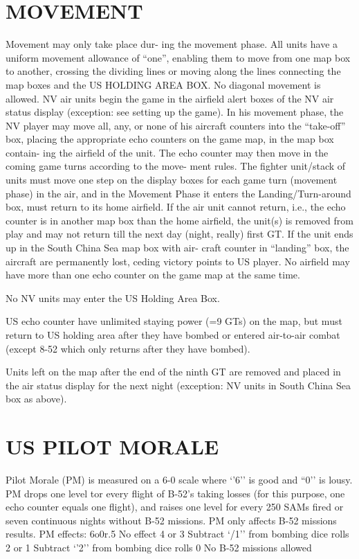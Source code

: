 \section*{MOVEMENT}
Movement may only take place dur-
ing the movement phase. All units
have a uniform movement allowance
of “one”, enabling them to move
from one map box to another, crossing
the dividing lines or moving along the
lines connecting the map boxes and
the US HOLDING AREA BOX. No
diagonal movement is allowed.
NV air units begin the game in the
airfield alert boxes of the NV air
status display (exception: see setting
up the game). In his movement
phase, the NV player may move all,
any, or none of his aircraft counters
into the “take-off” box, placing the
appropriate echo counters on the
game map, in the map box contain-
ing the airfield of the unit. The echo
counter may then move in the coming
game turns according to the move-
ment rules. The fighter unit/stack of
units must move one step on the
display boxes for each game turn
(movement phase) in the air, and in
the Movement Phase it enters the
Landing/Turn-around box, must
return to its home airfield. If the air
unit cannot return, i.e., the echo
counter is in another map box than
the home airfield, the unit(s) is
removed from play and may not
return till the next day (night, really)
first GT. If the unit ends up in the
South China Sea map box with air-
craft counter in “landing” box, the
aircraft are permanently lost, ceding
victory points to US player.
No airfield may have more than one
echo counter on the game map at
the same time.

No NV units may enter the US
Holding Area Box.

US echo counter have unlimited
staying power (=9 GTs) on the map,
but must return to US holding area
after they have bombed or entered
air-to-air combat (except 8-52 which
only returns after they have bombed).

Units left on the map after the end
of the ninth GT are removed and
placed in the air status display for
the next night (exception: NV units in
South China Sea box as above).

\section*{US PILOT MORALE}
Pilot Morale (PM) is measured on a
6-0 scale where ‘’6’’ is good and
“0’’ is lousy. PM drops one level tor
every flight of B-52’s taking losses
(for this purpose, one echo counter
equals one flight), and raises one
level for every 250 SAMs fired or
seven continuous nights without B-52
missions. PM only affects B-52
missions results.
PM effects:
6o0r.5 No effect
4 or 3 Subtract ‘/1’’ from bombing
dice rolls
2 or 1 Subtract ‘’2’’ from bombing
dice rolls
0 No B-52 missions allowed


